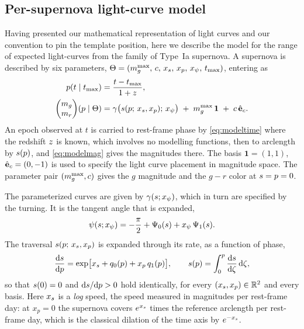\documentclass[11pt]{article}
\theoremstyle{plain}
\begin{document}
\subsection{Per-supernova light-curve model}
\label{sec:pars}
Having presented our mathematical representation of light curves and our convention to pin
the template position, here we describe the
model for the range of expected light-curves from the family of Type~Ia supernova.
A supernova is described by six parameters,
$\Theta = (m_{g}^{\max},\, c,\, x_{s},\, x_p,\, x_{\psi},\, t_{\mathrm{max}})$, entering as
\begin{align}
  p(t \mid t_{\mathrm{max}}) &= \frac{t - t_{\mathrm{max}}}{1 + z} ,
    \label{eq:modeltime}\\
  \begin{pmatrix} m_{g} \\ m_{r} \end{pmatrix}\!(p \mid \Theta)
    &= \gamma\bigl(s(p;\, x_{s}, x_p);\, x_{\psi}\bigr)
       \;+\; m_{g}^{\max}\,\mathbf{1} \;+\; c\,\hat{\mathbf{e}}_{c} .
    \label{eq:modelmag}
\end{align}
An epoch observed at $t$ is carried to
rest-frame phase by \eqref{eq:modeltime} where the redshift $z$ is known, which involves no modelling functions, then to
arclength by $s(p)$, and \eqref{eq:modelmag} gives the magnitudes there.
The
basis $\mathbf{1} = (1,1)$, $\hat{\mathbf{e}}_{c} = (0,-1)$ is used to specify the light curve placement in magnitude space.
The parameter pair
$(m_{g}^{\max}, c)$
gives the $g$ magnitude and the $g-r$ color  at $s = p = 0$.

The parameterized curves are given by $\gamma(s;x_{\psi})$, which in turn are
specified by the turning.  It is the tangent angle that is expanded,
\begin{equation}
  \psi(s; x_{\psi}) = -\frac{\pi}{2} + \Psi_{0}(s)
                            + x_{\psi}\,\Psi_{1}(s) .
  \label{eq:curvlin}
\end{equation}
The traversal $s(p;\, x_{s}, x_p)$ is expanded through its rate, as a function
of phase,
\begin{equation}
  \frac{\mathrm{d} s}{\mathrm{d} p}
    = \exp\bigl[x_{s} + q_{0}(p) + x_p\,q_{1}(p)\bigr] ,
  \qquad
  s(p) = \int_{0}^{p} \frac{\mathrm{d} s}{\mathrm{d} \zeta}\,\mathrm{d}\zeta ,
  \label{eq:travlog}
\end{equation}
so that $s(0) = 0$ and $\mathrm{d}s/\mathrm{d}p > 0$ hold identically, for every
$(x_{s}, x_p) \in \mathbb{R}^{2}$ and every basis. Here $x_{s}$ is a \emph{log} speed, the
speed measured in magnitudes per rest-frame day: at
$x_p = 0$ the supernova covers $e^{x_{s}}$ times the reference arclength per rest-frame
day, which is the classical dilation of the time axis by $e^{-x_{s}}$.
\end{document}
